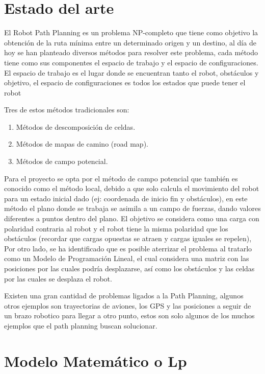 \documentclass[journal, 10pt]{IEEEtran}
\begin{document}
\section{Estado del arte }
El Robot Path Planning es un problema NP-completo que tiene como objetivo la obtención de la ruta mínima entre un determinado origen y un destino, al día de hoy se han planteado diversos métodos para resolver este problema, cada método tiene como sus componentes el espacio de trabajo y el espacio de configuraciones. El espacio de trabajo es el lugar donde se encuentran tanto el robot, obstáculos y objetivo, el espacio de configuraciones es todos los estados que puede tener el robot

Tres de estos métodos tradicionales son:
\begin{enumerate}
    \item Métodos de descomposición de celdas. \cite{trayectorias:2006}
    \item Métodos de mapas de camino (road map).\cite{trayectorias:2006}
    \item Métodos de campo potencial.\cite{trayectorias:2006}
\end{enumerate}
Para el proyecto se opta por el método de campo potencial que también es conocido como el método local\cite{trayectorias:2006}, debido a que solo calcula el movimiento del robot para un estado inicial dado (ej: coordenada de inicio fin y obstáculos), en este método el plano donde se trabaja se asimila a un campo de fuerzas, dando valores diferentes a puntos dentro del plano.
El objetivo se considera como una carga con polaridad contraria al robot y el robot tiene la misma polaridad que los obstáculos (recordar que cargas opuestas se atraen y cargas iguales se repelen),
Por otro lado, se ha identificado que es posible aterrizar el problema al tratarlo como un Modelo de Programación Lineal, el cual considera una matriz con las posiciones por las cuales podría desplazarse, así como los obstáculos y las celdas por las cuales se desplaza el robot.

Existen una gran cantidad de problemas ligados a la Path Planning, algunos otros ejemplos son trayectorias de aviones, los GPS y las posiciones a seguir de un brazo robotico  para llegar a otro punto, estos son solo algunos de los muchos ejemplos que el path planning buscan solucionar.

\section{Modelo Matemático o Lp}
\end{document}

